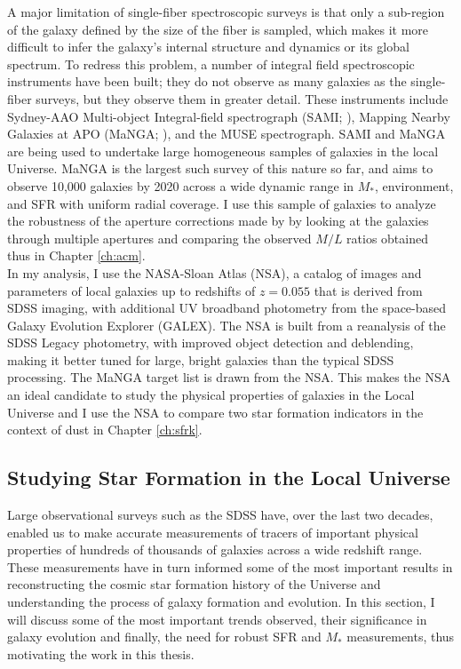 A major limitation of single-fiber spectroscopic surveys is that only
a sub-region of the galaxy defined by the size of the fiber is
sampled, which makes it more difficult to infer the galaxy's internal
structure and dynamics or its global spectrum. To redress this
problem, a number of integral field spectroscopic instruments have
been built; they do not observe as many galaxies as the single-fiber
surveys, but they observe them in greater detail. These instruments
include Sydney-AAO Multi-object Integral-field spectrograph (SAMI;
\citealt{bryant_sami_2015}), Mapping Nearby Galaxies at APO (MaNGA;
\citealt{bundy_overview_2014}), and the MUSE spectrograph. SAMI and
MaNGA are being used to undertake large homogeneous samples of
galaxies in the local Universe.  MaNGA is the largest such survey of
this nature so far, and aims to observe 10,000 galaxies by 2020 across
a wide dynamic range in $M_{*}$, environment, and SFR with uniform
radial coverage.  I use this sample of galaxies to analyze the
robustness of the aperture corrections made by
\citet{kauffmann_environmental_2004} by looking at the galaxies
through multiple apertures and comparing the observed $M/L$ ratios
obtained thus in Chapter \ref{ch:acm}.\\

In my analysis, I use the NASA-Sloan Atlas (NSA), a catalog of images
and parameters of local galaxies up to redshifts of $z = 0.055$ that
is derived from SDSS imaging, with additional UV broadband photometry
from the space-based Galaxy Evolution Explorer (GALEX). The NSA is
built from a reanalysis \citep{2011AJ....142...31B} of the SDSS Legacy
photometry, with improved object detection and deblending, making it
better tuned for large, bright galaxies than the typical SDSS
processing. The MaNGA target list is drawn from the NSA. This makes
the NSA an ideal candidate to study the physical properties of
galaxies in the Local Universe and I use the NSA to compare two star
formation indicators in the context of dust in Chapter
\ref{ch:sfrk}.\\

\subsection{Studying Star Formation in the Local Universe}
\label{sec: results}

Large observational surveys such as the SDSS have, over the last two
decades, enabled us to make accurate measurements of tracers of
important physical properties of hundreds of thousands of galaxies
across a wide redshift range. These measurements have in turn informed
some of the most important results in reconstructing the cosmic star
formation history of the Universe and understanding the process of
galaxy formation and evolution. In this section, I will discuss some
of the most important trends observed, their significance in galaxy
evolution and finally, the need for robust SFR and $M_{*}$
measurements, thus motivating the work in this thesis.\\

